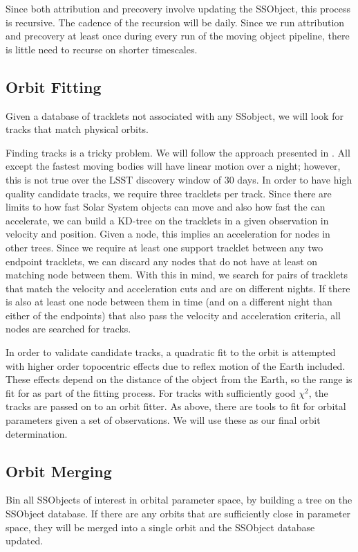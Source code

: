 Since both attribution and precovery involve updating the SSObject, this process is recursive.  The cadence of the recursion will be daily.  Since we run attribution and precovery at least once during every run of the moving object pipeline, there is little need to recurse on shorter timescales.


\subsection{Orbit Fitting}
\label{sec:acOrbitFitting}
Given a database of tracklets not associated with any SSobject, we will look for tracks that match physical orbits.

Finding tracks is a tricky problem.  We will follow the approach presented in \cite{2007ASPC..376..395K}.  All except the fastest moving bodies will have linear motion over a night; however, this is not true over the LSST discovery window of 30 days.  In order to have high quality candidate tracks, we require three tracklets per track.  Since there are limits to how fast Solar System objects can move and also how fast the can accelerate, we can build a KD-tree on the tracklets in a given observation in velocity and position.  Given a node, this implies an acceleration for nodes in other trees.  Since we require at least one support tracklet between any two endpoint tracklets, we can discard any nodes that do not have at least on matching node between them.  With this in mind, we search for pairs of tracklets that match the velocity and acceleration cuts and are on different nights.  If there is also at least one node between them in time (and on a different night than either of the endpoints) that also pass the velocity and acceleration criteria, all nodes are searched for tracks.

In order to validate candidate tracks, a quadratic fit to the orbit is attempted with higher order topocentric effects due to reflex motion of the Earth included.  These effects depend on the distance of the object from the Earth, so the range is fit for as part of the fitting process.  For tracks with sufficiently good $\chi^2$, the tracks are passed on to an orbit fitter.  As above, there are tools to fit for orbital parameters given a set of observations.  We will use these as our final orbit determination.

\subsection{Orbit Merging}
\label{sec:acOrbitMerging}
Bin all SSObjects of interest in orbital parameter space, by building a tree on the SSObject database.  If there are any orbits that are sufficiently close in parameter space, they will be merged into a single orbit and the SSObject database updated.
